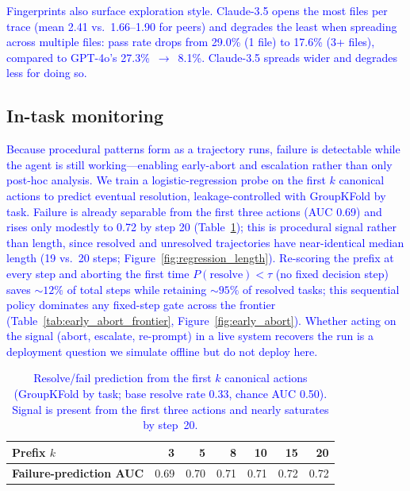 \documentclass[12pt]{article}
\begin{document}
\textcolor{blue}{Fingerprints also surface exploration style. Claude-3.5 opens the most files per trace (mean 2.41 vs.\ 1.66--1.90 for peers) and degrades the least when spreading across multiple files: pass rate drops from 29.0\% (1 file) to 17.6\% (3+ files), compared to GPT-4o's 27.3\%~$\to$~8.1\%. Claude-3.5 spreads wider and degrades less for doing so.}

\subsection{In-task monitoring}
\textcolor{blue}{Because procedural patterns form as a trajectory runs, failure is detectable while the agent is still working---enabling early-abort and escalation rather than only post-hoc analysis. We train a logistic-regression probe on the first $k$ canonical actions to predict eventual resolution, leakage-controlled with GroupKFold by task. Failure is already separable from the first three actions (AUC 0.69) and rises only modestly to 0.72 by step 20 (Table~\ref{tab:early_abort_auc}); this is procedural signal rather than length, since resolved and unresolved trajectories have near-identical median length (19 vs.\ 20 steps; Figure~\ref{fig:regression_length}). Re-scoring the prefix at every step and aborting the first time $P(\text{resolve})<\tau$ (no fixed decision step) saves ${\sim}12\%$ of total steps while retaining ${\sim}95\%$ of resolved tasks; this sequential policy dominates any fixed-step gate across the frontier (Table~\ref{tab:early_abort_frontier}, Figure~\ref{fig:early_abort}). Whether acting on the signal (abort, escalate, re-prompt) in a live system recovers the run is a deployment question we simulate offline but do not deploy here.}

\begin{table}[H]
\centering\small
\begin{tabular}{lrrrrrr}
\toprule
\textbf{Prefix $k$} & 3 & 5 & 8 & 10 & 15 & 20 \\
\midrule
\textbf{Failure-prediction AUC} & 0.69 & 0.70 & 0.71 & 0.71 & 0.72 & 0.72 \\
\bottomrule
\end{tabular}
\caption{\textcolor{blue}{Resolve/fail prediction from the first $k$ canonical actions (GroupKFold by task; base resolve rate 0.33, chance AUC 0.50). Signal is present from the first three actions and nearly saturates by step~20.}}
\label{tab:early_abort_auc}
\end{table}
\end{document}
